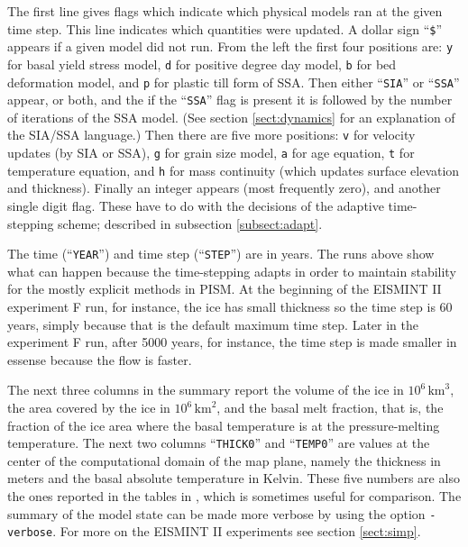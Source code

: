 \documentclass[11pt,final]{amsart}
\renewcommand{\t}[1]{\texttt{#1}}
\begin{document}
\noindent The first line gives flags which indicate which physical models ran at the given time step.  This line indicates which quantities were updated.  A dollar sign ``\t{\$}'' appears if a given model did not run.  From the left the first four positions are: \t{y} for basal yield stress model, \t{d} for positive degree day model, \t{b} for bed deformation model, and \t{p} for plastic till form of SSA.  Then either ``\verb|SIA|'' or ``\verb|SSA|'' appear, or both, and the if the ``\verb|SSA|'' flag is present it is followed by the number of iterations of the SSA model.  (See section \ref{sect:dynamics} for an explanation of the SIA/SSA language.)  Then there are five more positions: \t{v} for velocity updates (by SIA or SSA), \t{g} for grain size model, \t{a} for age equation, \t{t} for temperature equation, and \t{h} for mass continuity (which updates surface elevation and thickness).  Finally an integer appears (most frequently zero), and another single digit flag.  These have to do with the decisions of the adaptive time-stepping scheme; described in subsection \ref{subsect:adapt}.

The time (``\t{YEAR}'') and time step (``\t{STEP}'') are in years.  The runs above show what can happen because the time-stepping adapts in order to maintain stability for the mostly explicit methods in PISM.  At the beginning of the EISMINT II experiment F run, for instance, the ice has small thickness so the time step is 60 years, simply because that is the default maximum time step.  Later in the experiment F run, after 5000 years, for instance, the time step is made smaller in essense because the flow is faster.

The next three columns in the summary report the volume of the ice in $10^6 \,\text{km}^3$, the area covered by the ice in $10^6\,\text{km}^2$, and the basal melt fraction, that is, the fraction of the ice area where the basal temperature is at the pressure-melting temperature.  The next two columns ``\texttt{THICK0}'' and ``\texttt{TEMP0}'' are values at the center of the computational domain of the map plane, namely the thickness in meters and the basal absolute temperature in Kelvin.  These five numbers are also the ones reported in the tables in \cite{EISMINT00}, which is sometimes useful for comparison.  The summary of the model state can be made more verbose by using the option \verb|-verbose|.  For more on the EISMINT II experiments see section \ref{sect:simp}.
\end{document}
